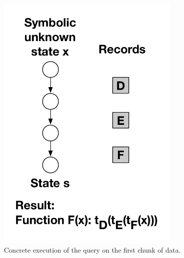 \begin{refsection}
\begin{figure}
  \begin{minipage}[b]{0.3\textwidth}
    \begin{flushleft}
      \centering
      \caption{Concrete execution of the query on the first chunk of data.}
      \label{fig:symple_ex3}
    \end{flushleft}
  \end{minipage}
  \hfill
  \begin{minipage}[b]{0.3\textwidth}
    \centering
    \includegraphics[width=0.8\textwidth]{figures/symple_ex4}

\end{minipage}
\end{figure}
\end{refsection}
